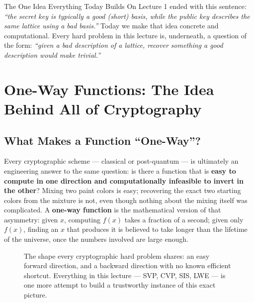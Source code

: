 \begin{rmkbox}{The One Idea Everything Today Builds On}
Lecture 1 ended with this sentence: \emph{``the secret key is typically a good (short) basis, while the public key describes the same lattice using a bad basis.''} Today we make that idea concrete and computational. Every hard problem in this lecture is, underneath, a question of the form: \emph{``given a bad description of a lattice, recover something a good description would make trivial.''}
\end{rmkbox}

\section{One-Way Functions: The Idea Behind All of Cryptography}
\label{sec:L2:one-way-functions-the-idea-behind-all-of}

\subsection{What Makes a Function ``One-Way''?}
\label{sec:L2:what-makes-a-function-one-way}

Every cryptographic scheme --- classical or post-quantum --- is ultimately an engineering answer to the same question: is there a function that is \textbf{easy to compute in one direction and computationally infeasible to invert in the other}? Mixing two paint colors is easy; recovering the exact two starting colors from the mixture is not, even though nothing about the mixing itself was complicated. A \textbf{one-way function} is the mathematical version of that asymmetry: given $x$, computing $f(x)$ takes a fraction of a second; given only $f(x)$, finding an $x$ that produces it is believed to take longer than the lifetime of the universe, once the numbers involved are large enough.

\begin{figure}[ht]
\centering
{}
\caption{The shape every cryptographic hard problem shares: an easy forward direction, and a backward direction with no known efficient shortcut. Everything in this lecture --- SVP, CVP, SIS, LWE --- is one more attempt to build a trustworthy instance of this exact picture.}
\label{fig:owf-schematic}
\end{figure}

